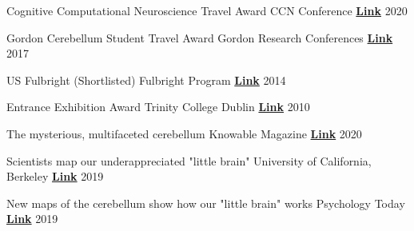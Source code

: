 \begin{cvhonors}
  
 \cvhonor
   {Cognitive Computational Neuroscience Travel Award}
   {CCN Conference}
   {\href{https://2021.ccneuro.org/index.php}{\textbf{Link}}}
   {2020}
   
 \cvhonor
   {Gordon Cerebellum Student Travel Award}
   {Gordon Research Conferences}
   {\href{https://www.grc.org/cerebellum-grs-conference/2017/}{\textbf{Link}}}
   {2017}
     
 \cvhonor
   {US Fulbright (Shortlisted)}
   {Fulbright Program}
   {\href{https://www.fulbright.ie/going-to-the-usa/fulbright-irish-scholar-awards/}{\textbf{Link}}}
   {2014}
   
  \cvhonor
   {Entrance Exhibition Award}
   {Trinity College Dublin}
   {\href{https://www.tcd.ie/study/undergraduate/entrance-exhibition/}{\textbf{Link}}}
   {2010}

\end{cvhonors}


\begin{cvhonors}

  \cvhonor
    {The mysterious, multifaceted cerebellum} %
    {Knowable Magazine}
    {\href{https://knowablemagazine.org/article/mind/2020/what-does-the-cerebellum-do}{\textbf{Link}}}
    {2020}

  \cvhonor
    {Scientists map our underappreciated "little brain"} %
    {University of California, Berkeley}
    {\href{https://news.berkeley.edu/story_jump/cerebellum-map/}{\textbf{Link}}}
    {2019}
    
  \cvhonor
    {New maps of the cerebellum show how our "little brain" works} %
    {Psychology Today}
    {\href{https://www.psychologytoday.com/us/blog/the-athletes-way/201907/new-maps-the-cerebellum-show-how-our-little-brain-works}{\textbf{Link}}}
    {2019}

\end{cvhonors}